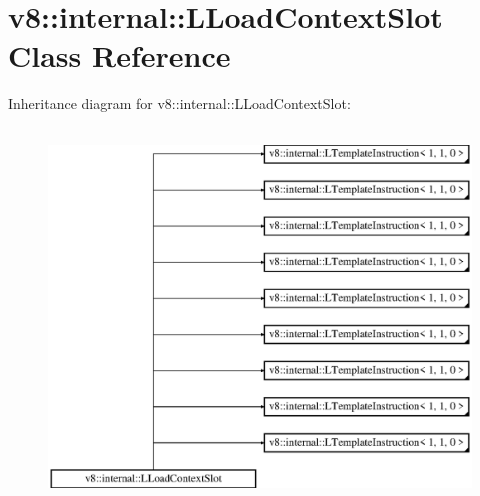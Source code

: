 \hypertarget{classv8_1_1internal_1_1_l_load_context_slot}{}\section{v8\+:\+:internal\+:\+:L\+Load\+Context\+Slot Class Reference}
\label{classv8_1_1internal_1_1_l_load_context_slot}
Inheritance diagram for v8\+:\+:internal\+:\+:L\+Load\+Context\+Slot\+:\begin{figure}[H]
\begin{center}
\leavevmode
\includegraphics[height=10.000000cm]{classv8_1_1internal_1_1_l_load_context_slot}
\end{center}
\end{figure}
